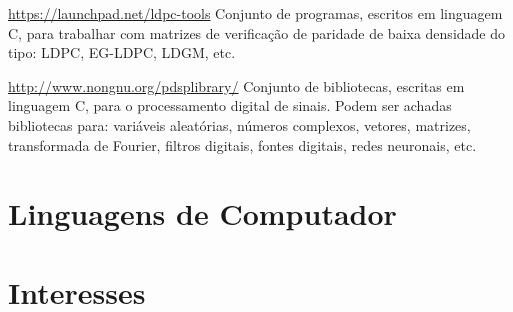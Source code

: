 \documentclass[11pt,a4paper,sans]{moderncv} %
\begin{document}
			{\url{https://launchpad.net/ldpc-tools}}
			{}{}
			{Conjunto de programas, escritos em linguagem C, para 
			trabalhar com matrizes de verificação de paridade 
			de baixa densidade do tipo: LDPC, EG-LDPC, LDGM, etc.}
			

			{\url{http://www.nongnu.org/pdsplibrary/}}
			{}{}
			{Conjunto de bibliotecas, escritas em linguagem C, para 
			o processamento digital de sinais. Podem ser achadas 
			bibliotecas para: variáveis aleatórias, números complexos, 
			vetores, matrizes, transformada de Fourier, filtros 
			digitais, fontes digitais, redes neuronais, etc.}


\section{Linguagens de Computador}




\section{Interesses}

\renewcommand{\listitemsymbol}{-~} %
\end{document}
